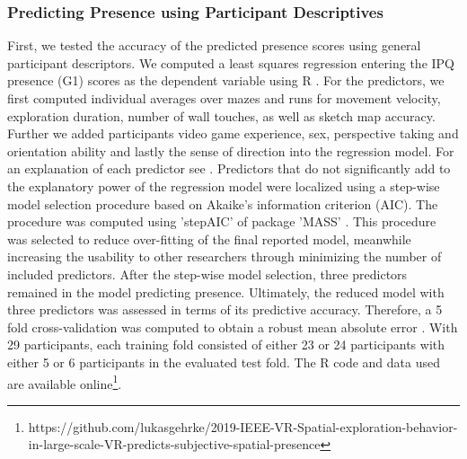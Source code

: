 \subsubsection{Predicting Presence using Participant Descriptives} First, we tested the accuracy of the predicted presence scores using general participant descriptors. We computed a least squares regression entering the IPQ presence (G1) scores as the dependent variable using R \cite{RFoundationforStatisticalComputing.2018}. For the predictors, we first computed individual averages over mazes and runs for movement velocity, exploration duration, number of wall touches, as well as sketch map accuracy. Further we added participants video game experience, sex, perspective taking and orientation ability and lastly the sense of direction into the regression model. For an explanation of each predictor see \cite{Gehrke2018}. Predictors that do not significantly add to the explanatory power of the regression model were localized using a step-wise model selection procedure based on Akaike's information criterion (AIC). The procedure was computed using 'stepAIC' of package 'MASS' \cite{Akaike1998a, Venables2002}. This procedure was selected to reduce over-fitting of the final reported model, meanwhile increasing the usability to other researchers through minimizing the number of included predictors. After the step-wise model selection, three predictors remained in the model predicting presence. Ultimately, the reduced model with three predictors was assessed in terms of its predictive accuracy. Therefore, a 5 fold cross-validation was computed to obtain a robust mean absolute error \cite{Mosteller1968, Furnkranz2011}. With 29 participants, each training fold consisted of either 23 or 24 participants with either 5 or 6 participants in the evaluated test fold. The R code and data used are available online\footnote{https://github.com/lukasgehrke/2019-IEEE-VR-Spatial-exploration-behavior-in-large-scale-VR-predicts-subjective-spatial-presence}.